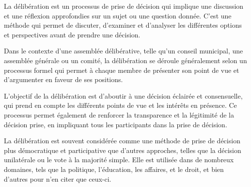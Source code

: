 La délibération est un processus de prise de décision qui 
implique une discussion et une réflexion approfondies sur 
un sujet ou une question donnée. C'est une méthode qui permet 
de discuter, d'examiner et d'analyser les différentes options 
et perspectives avant de prendre une décision.

Dans le contexte d'une assemblée délibérative, 
telle qu'un conseil municipal, une assemblée générale ou un
comité, la délibération se déroule généralement selon 
un processus formel qui permet à chaque membre de présenter
son point de vue et d'argumenter en faveur de ses positions.

L'objectif de la délibération est d'aboutir à une décision 
éclairée et consensuelle, qui prend en compte les différents 
points de vue et les intérêts en présence. Ce processus 
permet également de renforcer la transparence et 
la légitimité de la décision prise, en impliquant tous 
les participants dans la prise de décision.

La délibération est souvent considérée comme une méthode de
 prise de décision plus démocratique et participative que 
 d'autres approches, telles que la décision unilatérale ou le 
 vote à la majorité simple. Elle est utilisée dans de nombreux
  domaines, tels que la politique, l'éducation, les affaires, 
  et le droit, et bien d'autres pour n'en citer que ceux-ci.
